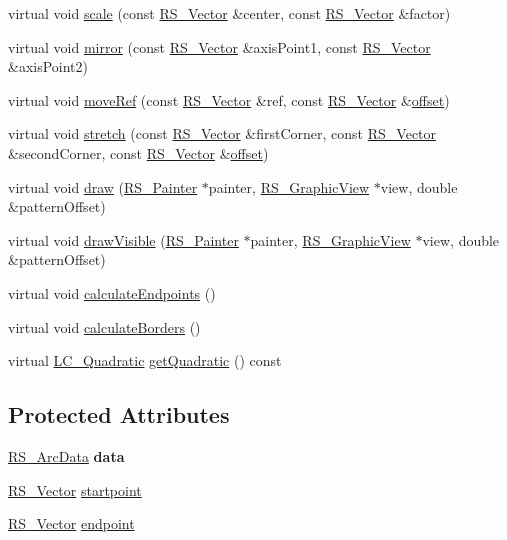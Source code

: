 \begin{DoxyCompactItemize}
\item 
virtual void \hyperlink{classRS__Arc_a82b9972afd464c52d63028ab3e8ae587}{scale} (const \hyperlink{classRS__Vector}{R\-S\-\_\-\-Vector} \&center, const \hyperlink{classRS__Vector}{R\-S\-\_\-\-Vector} \&factor)
\item 
virtual void \hyperlink{classRS__Arc_a377630d6bae34b5dc351bd56d308cd65}{mirror} (const \hyperlink{classRS__Vector}{R\-S\-\_\-\-Vector} \&axis\-Point1, const \hyperlink{classRS__Vector}{R\-S\-\_\-\-Vector} \&axis\-Point2)
\item 
virtual void \hyperlink{classRS__Arc_a6688375ae6a3cf0ecb94ed827e64d657}{move\-Ref} (const \hyperlink{classRS__Vector}{R\-S\-\_\-\-Vector} \&ref, const \hyperlink{classRS__Vector}{R\-S\-\_\-\-Vector} \&\hyperlink{classRS__Arc_aa7da3f3ea0ece264776e3f7cb25e669e}{offset})
\item 
virtual void \hyperlink{classRS__Arc_af89dda8ad3130ecc7eb9fbe9bfa97d4a}{stretch} (const \hyperlink{classRS__Vector}{R\-S\-\_\-\-Vector} \&first\-Corner, const \hyperlink{classRS__Vector}{R\-S\-\_\-\-Vector} \&second\-Corner, const \hyperlink{classRS__Vector}{R\-S\-\_\-\-Vector} \&\hyperlink{classRS__Arc_aa7da3f3ea0ece264776e3f7cb25e669e}{offset})
\item 
virtual void \hyperlink{classRS__Arc_a6689587180de0b4d8ae3cd02c62de961}{draw} (\hyperlink{classRS__Painter}{R\-S\-\_\-\-Painter} $\ast$painter, \hyperlink{classRS__GraphicView}{R\-S\-\_\-\-Graphic\-View} $\ast$view, double \&pattern\-Offset)
\item 
virtual void \hyperlink{classRS__Arc_a692051805c2e0dcd5fd774e318533a73}{draw\-Visible} (\hyperlink{classRS__Painter}{R\-S\-\_\-\-Painter} $\ast$painter, \hyperlink{classRS__GraphicView}{R\-S\-\_\-\-Graphic\-View} $\ast$view, double \&pattern\-Offset)
\item 
virtual void \hyperlink{classRS__Arc_a0edc8bb5bcf9c110fc4af8f5e9c244f4}{calculate\-Endpoints} ()
\item 
virtual void \hyperlink{classRS__Arc_a4479d6af8f35e1b5b000b4fcd8b4e6c7}{calculate\-Borders} ()
\item 
virtual \hyperlink{classLC__Quadratic}{L\-C\-\_\-\-Quadratic} \hyperlink{classRS__Arc_ab68aa71dcfecf85b56bd819fa8413b2c}{get\-Quadratic} () const 
\end{DoxyCompactItemize}
\subsection*{Protected Attributes}
\begin{DoxyCompactItemize}
\item 
\hypertarget{classRS__Arc_ad9f01a43d1e01bebc358853431d9d758}{\hyperlink{classRS__ArcData}{R\-S\-\_\-\-Arc\-Data} {\bfseries data}}\label{classRS__Arc_ad9f01a43d1e01bebc358853431d9d758}

\item 
\hyperlink{classRS__Vector}{R\-S\-\_\-\-Vector} \hyperlink{classRS__Arc_ac705bf21cf0c828a157fab851f793ce7}{startpoint}
\item 
\hyperlink{classRS__Vector}{R\-S\-\_\-\-Vector} \hyperlink{classRS__Arc_a3066cec5f81fb1f1c7acc6357b1956cd}{endpoint}
\end{DoxyCompactItemize}
